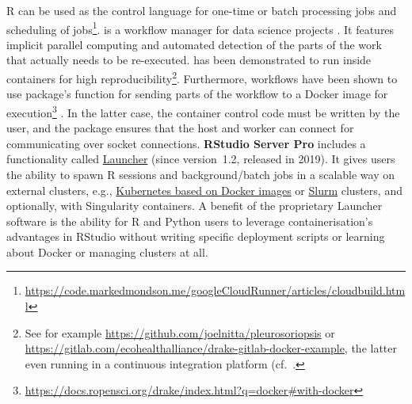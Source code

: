 R can be used as the control language for one-time or batch processing
jobs and scheduling of
jobs\footnote{\href{https://code.markedmondson.me/googleCloudRunner/articles/cloudbuild.html}{https://code.markedmondson.me/googleCloudRunner/articles/cloudbuild.html}}.
\label{drake} \textbf{} is a workflow manager for data
science projects \citep{landau_drake_2019}. It features implicit
parallel computing and automated detection of the parts of the work that
actually needs to be re-executed.  has been demonstrated to
run inside containers for high
reproducibility\footnote{See for example \href{https://github.com/joelnitta/pleurosoriopsis}{https://github.com/joelnitta/pleurosoriopsis} or \href{https://gitlab.com/ecohealthalliance/drake-gitlab-docker-example}{https://gitlab.com/ecohealthalliance/drake-gitlab-docker-example}, the latter even running in a continuous integration platform (cf.~.}.
Furthermore,  workflows have been shown to use 
package's function  for sending parts of the
workflow to a Docker image for
execution\footnote{\href{https://docs.ropensci.org/drake/index.html?q=docker\#with-docker}{https://docs.ropensci.org/drake/index.html?q=docker\#with-docker}}
\citep[see package's function documentation;~][]{future_2020}. In the
latter case, the container control code must be written by the user, and
the  package ensures that the host and worker can connect
for communicating over socket connections. \textbf{RStudio Server Pro}
includes a functionality called
\href{https://solutions.rstudio.com/launcher/overview/}{Launcher} (since
version~1.2, released in 2019). It gives users the ability to spawn R
sessions and background/batch jobs in a scalable way on external
clusters, e.g.,
\href{https://support.rstudio.com/hc/en-us/articles/360019253393-Using-Docker-images-with-RStudio-Server-Pro-Launcher-and-Kubernetes}{Kubernetes
based on Docker images} or \href{https://slurm.schedmd.com/}{Slurm}
clusters, and optionally, with Singularity containers. A benefit of the
proprietary Launcher software is the ability for R and Python users to
leverage containerisation's advantages in RStudio without writing
specific deployment scripts or learning about Docker or managing
clusters at all.

